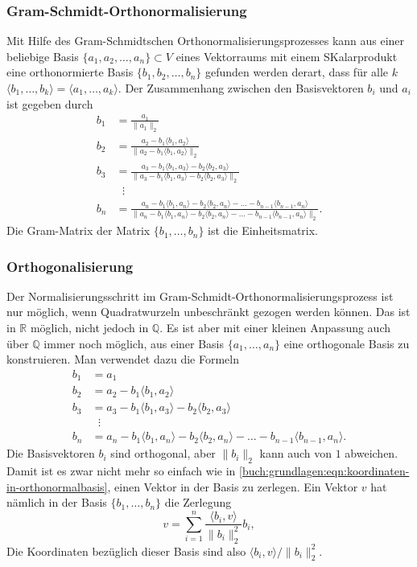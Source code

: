 \subsubsection{Gram-Schmidt-Orthonormalisierung}
Mit Hilfe des Gram-Schmidtschen Orthonormalisierungsprozesses kann aus
einer beliebige Basis $\{a_1,a_2,\dots,a_n\}\subset V$ eines Vektorraums
mit einem SKalarprodukt eine orthonormierte Basis 
$\{b_1,b_2,\dots,b_n\}$ gefunden werden derart, dass für alle $k$
$\langle b_1,\dots,b_k\rangle = \langle a_1,\dots ,a_k\rangle$.
%
Der Zusammenhang zwischen den Basisvektoren $b_i$ und $a_i$ ist
gegeben durch
\begin{align*}
b_1&=\frac{a_1}{\|a_1\|_2}
\\
b_2&=\frac{a_2-b_1\langle b_1,a_2\rangle}{\|a_2-b_1\langle b_1,a_2\rangle\|_2}
\\
b_3&=\frac{a_3-b_1\langle b_1,a_3\rangle-b_2\langle b_2,a_3\rangle}{\|a_3-b_1\langle b_1,a_3\rangle-b_2\langle b_2,a_3\rangle\|_2}
\\
&\phantom{n}\vdots\\
b_n
&=
\frac{
a_n-b_1\langle b_1,a_n\rangle-b_2\langle b_2,a_n\rangle
-\dots-b_{n-1}\langle b_{n-1},a_n\rangle
}{
\|
a_n-b_1\langle b_1,a_n\rangle-b_2\langle b_2,a_n\rangle
-\dots-b_{n-1}\langle b_{n-1},a_n\rangle
\|_2
}.
\end{align*}
Die Gram-Matrix der Matrix $\{b_1,\dots,b_n\}$ ist die Einheitsmatrix.

\subsubsection{Orthogonalisierung}
Der Normalisierungsschritt im Gram-Schmidt-Orthonormalisierungsprozess
ist nur möglich, wenn Quadratwurzeln unbeschränkt gezogen werden können.
Das ist in $\mathbb{R}$ möglich, nicht jedoch in $\mathbb{Q}$.
Es ist aber mit einer kleinen Anpassung auch über $\mathbb{Q}$
immer noch möglich, aus einer Basis $\{a_1,\dots,a_n\}$ eine orthogonale
Basis zu konstruieren.
Man verwendet dazu die Formeln
\begin{align*}
b_1&=a_1
\\
b_2&=a_2-b_1\langle b_1,a_2\rangle
\\
b_3&=a_3-b_1\langle b_1,a_3\rangle-b_2\langle b_2,a_3\rangle
\\
&\phantom{n}\vdots\\
b_n
&=
a_n-b_1\langle b_1,a_n\rangle-b_2\langle b_2,a_n\rangle
-\dots-b_{n-1}\langle b_{n-1},a_n\rangle.
\end{align*}
Die Basisvektoren $b_i$ sind orthogonal, aber $\|b_i\|_2$ kann auch
von $1$ abweichen.
Damit ist es zwar nicht mehr so einfach 
wie in \eqref{buch:grundlagen:eqn:koordinaten-in-orthonormalbasis},
einen Vektor in der Basis zu zerlegen.
Ein Vektor $v$ hat nämlich in der Basis $\{b_1,\dots,b_n\}$ die Zerlegung
\begin{equation}
v
=
\sum_{i=1}^n
\frac{\langle b_i,v\rangle}{\|b_i\|_2^2} b_i,
\label{buch:grundlagen:eqn:orthogonal-basiszerlegung}
\end{equation}
Die Koordinaten bezüglich dieser Basis sind also
$\langle b_i,v\rangle/\|b_i\|_2^2$.

